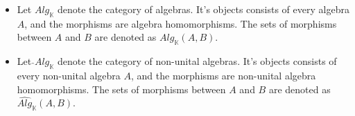 \documentclass[../thesis.tex]{subfiles}
\begin{document}
            \begin{definition}
                \begin{itemize}
                    \item Let $Alg_{\mathbb{K}}$ denote the category of algebras. It's objects consists of every algebra $A$, and the morphisms are algebra homomorphisms. The sets of morphisms between $A$ and $B$ are denoted as $Alg_{\mathbb{K}}(A,B)$.
                    \item Let $\widehat{}{Alg}_{\mathbb{K}}$ denote the category of non-unital algebras. It's objects consists of every non-unital algebra $A$, and the morphisms are non-unital algebra homomorphisms. The sets of morphisms between $A$ and $B$ are denoted as $\widehat{Alg}_{\mathbb{K}}(A,B)$.
                \end{itemize}
            \end{definition}
\end{document}
